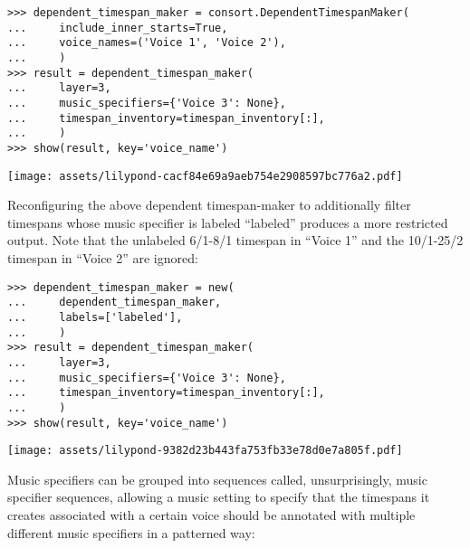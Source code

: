 \begin{abjadbookoutput}
\begin{singlespacing}
\vspace{-0.5\baselineskip}
\begin{lstlisting}
>>> dependent_timespan_maker = consort.DependentTimespanMaker(
...     include_inner_starts=True,
...     voice_names=('Voice 1', 'Voice 2'),
...     )
>>> result = dependent_timespan_maker(
...     layer=3,
...     music_specifiers={'Voice 3': None},
...     timespan_inventory=timespan_inventory[:],
...     )
>>> show(result, key='voice_name')
\end{lstlisting}
\noindent\texttt{[image: assets/lilypond-cacf84e69a9aeb754e2908597bc776a2.pdf]}
\end{singlespacing}
\end{abjadbookoutput}

\noindent Reconfiguring the above dependent timespan-maker to additionally
filter timespans whose music specifier is labeled \enquote{labeled} produces a
more restricted output. Note that the unlabeled 6/1-8/1 timespan in
\enquote{Voice 1} and the 10/1-25/2 timespan in \enquote{Voice 2} are ignored:

\begin{comment}
<abjad>
dependent_timespan_maker = new(
    dependent_timespan_maker,
    labels=['labeled'],
    )
result = dependent_timespan_maker(
    layer=3,
    music_specifiers={'Voice 3': None},
    timespan_inventory=timespan_inventory[:],
    )
show(result, key='voice_name')
</abjad>
\end{comment}

\begin{abjadbookoutput}
\begin{singlespacing}
\vspace{-0.5\baselineskip}
\begin{lstlisting}
>>> dependent_timespan_maker = new(
...     dependent_timespan_maker,
...     labels=['labeled'],
...     )
>>> result = dependent_timespan_maker(
...     layer=3,
...     music_specifiers={'Voice 3': None},
...     timespan_inventory=timespan_inventory[:],
...     )
>>> show(result, key='voice_name')
\end{lstlisting}
\noindent\texttt{[image: assets/lilypond-9382d23b443fa753fb33e78d0e7a805f.pdf]}
\end{singlespacing}
\end{abjadbookoutput}

\noindent Music specifiers can be grouped into sequences called,
unsurprisingly, music specifier sequences, allowing a music setting to specify
that the timespans it creates associated with a certain voice should be
annotated with multiple different music specifiers in a patterned way:

